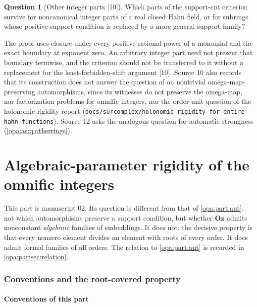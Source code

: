 \documentclass[11pt,oneside]{article}
\numberwithin{equation}{section}
\theoremstyle{definition}
\newtheorem{question}[question]{Question}
\theoremstyle{remark}
\newcommand{\Oz}{\mathbf{Oz}}
\newcommand{\src}[1]{\textup{\textsf{\small[#1]}}}
\newcommand{\fn}[1]{\nolinkurl{#1}}
\begin{document}
\begin{question}[Other integer parts \src{10}]\label{opa:sc:q:otherparts}
Which parts of the support-cut criterion survive for noncanonical integer parts
of a real closed Hahn field, or for subrings whose positive-support condition is
replaced by a more general support family?
\end{question}
The proof uses closure under every positive rational power of a monomial and the
exact boundary at exponent zero. An arbitrary integer part need not present that
boundary termwise, and the criterion should not be transferred to it without a
replacement for the least-forbidden-shift argument \src{10}. Source 10 also
records that its construction does not answer the question of \cite{KKS} on
nontrivial omega-map-preserving automorphisms, since its witnesses do not
preserve the omega-map, nor factorization problems for omnific integers, nor the
order-unit question of the holonomic-rigidity report
(\fn{docs/surcomplex/holonomic-rigidity-for-entire-hahn-functions}). Source 12 asks
the analogous question for automatic strongness (\cref{opa:as:q:otherrings}).

\part{Algebraic-parameter rigidity of the omnific integers}\label{opa:part:par}

This part is manuscript 02. Its question is different from that of
\cref{opa:part:aut}: not which automorphisms preserve a support condition, but
whether $\Oz$ admits nonconstant \emph{algebraic} families of embeddings. It does
not: the decisive property is that every nonzero element divides an element with
roots of every order. It does admit formal families of all orders. The relation to
\cref{opa:part:aut} is recorded in \cref{opa:par:sec:relation}.

\section{Conventions and the root-covered property}\label{opa:par:sec:foundations}

\subsection{Conventions of this part}\label{opa:par:sub:conv}
\end{document}
